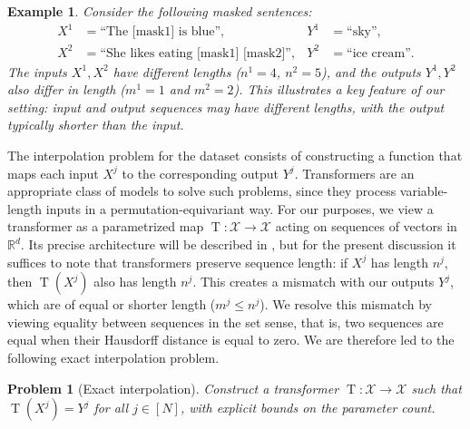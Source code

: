 \documentclass[pdflatex,sn-mathphys-num]{sn-jnl}%
\theoremstyle{thmstyleone}%
\theoremstyle{thmstyletwo}%
\newtheorem{example}[theorem]{Example}
\theoremstyle{thmstylethree}%
\newtheorem{problem}[theorem]{Problem}
\numberwithin{equation}{section}
\newcommand{\R}{\mathbb{R}}
\DeclareMathOperator{\T}{\mathrm{T}}
\begin{document}
\begin{example}
Consider the following masked sentences:
\begin{align*}
    X^1 &= \text{``The [mask1] is blue''}, & Y^1 &= \text{``sky''}, \\
    X^2 &= \text{``She likes eating [mask1] [mask2]''}, & Y^2 &= \text{``ice cream''}.
\end{align*}
The inputs $X^1, X^2$ have different lengths ($n^1 = 4$, $n^2 = 5$), and the outputs $Y^1, Y^2$ also differ in length ($m^1 = 1$ and $m^2 = 2$). This illustrates a key feature of our setting: input and output sequences may have different lengths, with the output typically shorter than the input.
\end{example}
%
The interpolation problem for the dataset consists of constructing a function that maps each input $X^j$ to the corresponding output $Y^j$. 
Transformers are an appropriate class of models to solve such problems, since they process variable-length inputs in a permutation-equivariant way. For our purposes, we view a transformer as a parametrized map $\T : \mathcal{X} \to \mathcal{X}$ acting on sequences of vectors in $\R^d$. Its precise architecture will be described in , but for the present discussion it suffices to note that transformers preserve sequence length: if $X^j$ has length $n^j$, then $\T(X^j)$ also has length $n^j$. This creates a mismatch with our outputs $Y^j$, which are of equal or shorter length ($m^j \leq n^j$). We resolve this mismatch by viewing equality between sequences in the set sense, that is, two sequences are equal when their Hausdorff distance is equal to zero. We are therefore led to the following exact interpolation problem. 

\begin{problem}[Exact interpolation]\label{pb:exactInterp}
    Construct a transformer $\T : \mathcal{X} \to \mathcal{X}$ such that $ \T(X^j) = Y^j$ for all $j \in [N]$, with explicit bounds on the parameter count.
\end{problem}
\end{document}
